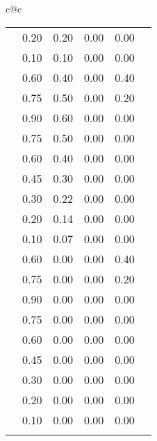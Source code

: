 \begin{footnotesize}
\begin{tabular}{c@{\quad}c}
\begin{tabular}{|c|c|cccc|}
\clrow{paleblue}                & 0.20 & 0.20 & 0.00 & 0.00 \\
\clrow{verypaleblue}            & 0.10 & 0.10 & 0.00 & 0.00 \\
\clspc
\clrow{verydeepskyblue}         & 0.60 & 0.40 & 0.00 & 0.40 \\
\clrow{deepskyblue}             & 0.75 & 0.50 & 0.00 & 0.20 \\
\clrow{verydarkskyblue}         & 0.90 & 0.60 & 0.00 & 0.00 \\
\clrow{darkskyblue}             & 0.75 & 0.50 & 0.00 & 0.00 \\
\clrow{skyblue}                 & 0.60 & 0.40 & 0.00 & 0.00 \\
\clrow{lightskyblue}            & 0.45 & 0.30 & 0.00 & 0.00 \\
\clrow{verylightskyblue}        & 0.30 & 0.22 & 0.00 & 0.00 \\
\clrow{paleskyblue}             & 0.20 & 0.14 & 0.00 & 0.00 \\
\clrow{verypaleskyblue}         & 0.10 & 0.07 & 0.00 & 0.00 \\
\clspc
\clrow{verydeepcyan}            & 0.60 & 0.00 & 0.00 & 0.40 \\
\clrow{deepcyan}                & 0.75 & 0.00 & 0.00 & 0.20 \\
\clrow{verydarkcyan}            & 0.90 & 0.00 & 0.00 & 0.00 \\
\clrow{darkcyan}                & 0.75 & 0.00 & 0.00 & 0.00 \\
\clrow{cyan}                    & 0.60 & 0.00 & 0.00 & 0.00 \\
\clrow{lightcyan}               & 0.45 & 0.00 & 0.00 & 0.00 \\
\clrow{verylightcyan}           & 0.30 & 0.00 & 0.00 & 0.00 \\
\clrow{palecyan}                & 0.20 & 0.00 & 0.00 & 0.00 \\
\clrow{verypalecyan}            & 0.10 & 0.00 & 0.00 & 0.00 \\
      \clspc
      \hline
    \end{tabular}
   \\
  \end{tabular}
\end{footnotesize}
